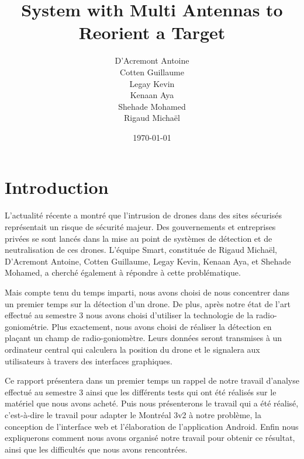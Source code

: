\documentclass[a4paper, 11pt, oneside, oldfontcommands]{memoir}
\title{System with Multi Antennas to Reorient a Target}
\author{D'Acremont Antoine\\Cotten Guillaume\\Legay Kevin\\Kenaan Aya\\Shehade Mohamed\\Rigaud Michaël}
\date{\today}
\newcounter{rem}[chapter]
\newcounter{th}[chapter]
\newcommand{\cad}{c'est-à-dire }
\begin{document}
\maketitle
\thispagestyle{empty}
\newpage

\tableofcontents






\chapter*{Introduction}

L’actualité récente a montré que l’intrusion de drones dans des sites sécurisés représentait un risque de sécurité majeur. Des gouvernements et entreprises privées se sont lancés dans la mise au point de systèmes de détection et de neutralisation de ces drones. L'équipe Smart, constituée de Rigaud Michaël, D'Acremont Antoine, Cotten Guillaume, Legay Kevin, Kenaan Aya, et Shehade Mohamed, a cherché également à répondre à cette problématique.

Mais compte tenu du temps imparti, nous avons choisi de nous concentrer dans un premier temps sur la détection d'un drone. De plus, après notre état de l'art effectué au semestre 3 nous avons choisi d'utiliser la technologie de la radio-goniométrie.  Plus exactement, nous avons choisi de réaliser la détection en plaçant un champ de radio-goniomètre. Leurs données seront transmises à un ordinateur central qui calculera la position du drone et le signalera aux utilisateurs à travers des interfaces graphiques.

Ce rapport présentera dans un premier temps un rappel de notre travail d'analyse effectué au semestre 3 ainsi que les différents tests qui ont été réalisés sur le matériel que nous avons acheté. Puis nous présenterons le travail qui a été réalisé, \cad le travail pour adapter le Montréal 3v2 à notre problème, la conception de l'interface web et l'élaboration de l'application Android. Enfin nous expliquerons comment nous avons organisé notre travail pour obtenir ce résultat, ainsi que les difficultés que nous avons rencontrées.



\newpage	  

\end{document}
